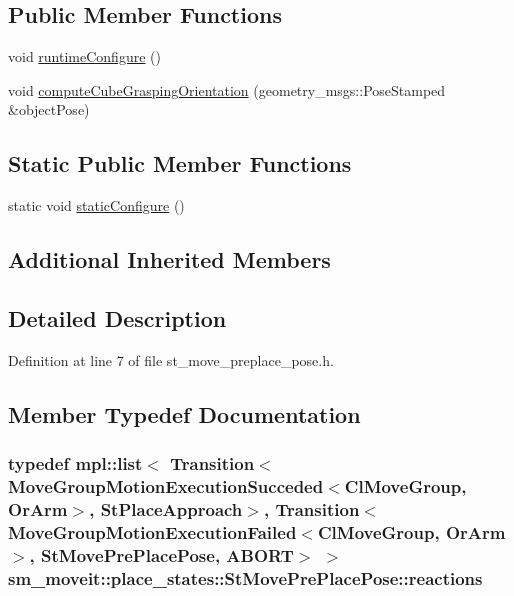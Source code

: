 \subsection*{Public Member Functions}
\begin{DoxyCompactItemize}
\item 
void \hyperlink{structsm__moveit_1_1place__states_1_1StMovePrePlacePose_afb210c2d0b44f2df7904a40f66f9ef0b}{runtime\+Configure} ()
\item 
void \hyperlink{structsm__moveit_1_1place__states_1_1StMovePrePlacePose_add6f85ba0aa1e3905645881ecd0ba4e1}{compute\+Cube\+Grasping\+Orientation} (geometry\+\_\+msgs\+::\+Pose\+Stamped \&object\+Pose)
\end{DoxyCompactItemize}
\subsection*{Static Public Member Functions}
\begin{DoxyCompactItemize}
\item 
static void \hyperlink{structsm__moveit_1_1place__states_1_1StMovePrePlacePose_a3dc8d058fe81bb5fe5db216d9ee506ba}{static\+Configure} ()
\end{DoxyCompactItemize}
\subsection*{Additional Inherited Members}


\subsection{Detailed Description}


Definition at line 7 of file st\+\_\+move\+\_\+preplace\+\_\+pose.\+h.



\subsection{Member Typedef Documentation}
\subsubsection[{\texorpdfstring{reactions}{reactions}}]{\setlength{\rightskip}{0pt plus 5cm}typedef mpl\+::list$<$ Transition$<${\bf Move\+Group\+Motion\+Execution\+Succeded}$<${\bf Cl\+Move\+Group}, {\bf Or\+Arm}$>$, {\bf St\+Place\+Approach}$>$, Transition$<${\bf Move\+Group\+Motion\+Execution\+Failed}$<${\bf Cl\+Move\+Group}, {\bf Or\+Arm}$>$, {\bf St\+Move\+Pre\+Place\+Pose}, {\bf A\+B\+O\+RT}$>$ $>$ {\bf sm\+\_\+moveit\+::place\+\_\+states\+::\+St\+Move\+Pre\+Place\+Pose\+::reactions}}\hypertarget{structsm__moveit_1_1place__states_1_1StMovePrePlacePose_aba9e304feab2249eac1087dd2e4f6719}{}\label{structsm__moveit_1_1place__states_1_1StMovePrePlacePose_aba9e304feab2249eac1087dd2e4f6719}


